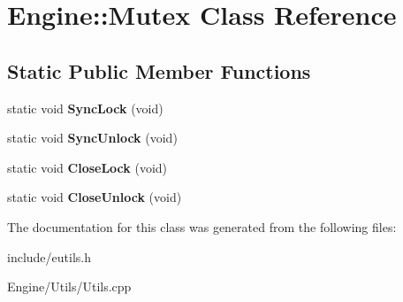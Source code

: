 \hypertarget{classEngine_1_1Mutex}{}\section{Engine\+:\+:Mutex Class Reference}
\label{classEngine_1_1Mutex}
\subsection*{Static Public Member Functions}
\begin{DoxyCompactItemize}
\item 
\hypertarget{classEngine_1_1Mutex_a727a44670b7661702a4562b2111ccc7e}{}static void {\bfseries Sync\+Lock} (void)\label{classEngine_1_1Mutex_a727a44670b7661702a4562b2111ccc7e}

\item 
\hypertarget{classEngine_1_1Mutex_a5cfce9311571230a1b7c2a7898290ddb}{}static void {\bfseries Sync\+Unlock} (void)\label{classEngine_1_1Mutex_a5cfce9311571230a1b7c2a7898290ddb}

\item 
\hypertarget{classEngine_1_1Mutex_a39b1245e69be06a3cffd06d4a4292ea3}{}static void {\bfseries Close\+Lock} (void)\label{classEngine_1_1Mutex_a39b1245e69be06a3cffd06d4a4292ea3}

\item 
\hypertarget{classEngine_1_1Mutex_adc66608d2e6e3b08aaba622f94eb88ce}{}static void {\bfseries Close\+Unlock} (void)\label{classEngine_1_1Mutex_adc66608d2e6e3b08aaba622f94eb88ce}

\end{DoxyCompactItemize}


The documentation for this class was generated from the following files\+:\begin{DoxyCompactItemize}
\item 
include/eutils.\+h\item 
Engine/\+Utils/Utils.\+cpp\end{DoxyCompactItemize}
